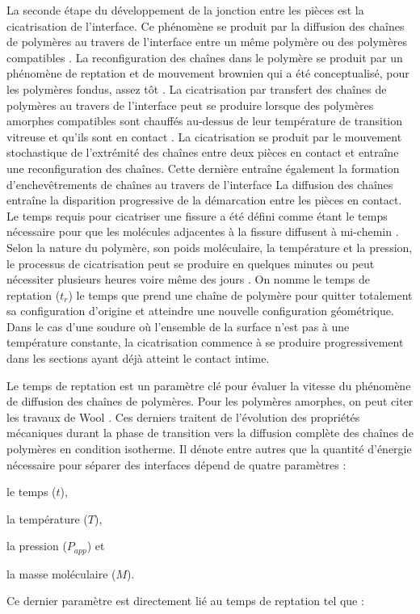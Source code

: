 La seconde étape du développement de la jonction entre les pièces est la cicatrisation de l'interface. 
Ce phénomène se produit par la diffusion des chaînes de polymères au travers de l'interface entre un même polymère ou des polymères compatibles \cite{Jud1981b}. 
La reconfiguration des chaînes dans le polymère se produit par un phénomène de reptation et de mouvement brownien qui a été conceptualisé, pour les polymères fondus, assez tôt \cite{DeGennes1971,Edwards1978b,Klein1978,Daoud1979}. 
La cicatrisation par transfert des chaînes de polymères au travers de l'interface peut se produire lorsque des polymères amorphes compatibles sont chauffés au-dessus de leur température de transition vitreuse et qu'ils sont en contact \cite{Jud1981a,Prager1981a}. 
La cicatrisation se produit par le mouvement stochastique de l'extrémité des chaînes entre deux pièces en contact et entraîne une reconfiguration des chaînes. 
Cette dernière entraîne également la formation d'enchevêtrements de chaînes au travers de l'interface \cite{Wool1983}
La diffusion des chaînes entraîne la disparition progressive de la démarcation entre les pièces en contact. 
Le temps requis pour cicatriser une fissure a été défini comme étant le temps nécessaire pour que les molécules adjacentes à la fissure diffusent à mi-chemin \cite{Prager1981a}.
Selon la nature du polymère, son poids moléculaire, la température et la pression, le processus de cicatrisation peut se produire en quelques minutes ou peut nécessiter plusieurs heures voire même des jours \cite{Prager1981a}. 
On nomme le temps de reptation ($t_r$) le temps que prend une chaîne de polymère pour quitter totalement sa configuration d'origine et atteindre une nouvelle configuration géométrique. 
Dans le cas d'une soudure où l'ensemble de la surface n'est pas à une température constante, la cicatrisation commence à se produire progressivement dans les sections ayant déjà atteint le contact intime. 

Le temps de reptation est un paramètre clé pour évaluer la vitesse du phénomène de diffusion des chaînes de polymères. 
Pour les polymères amorphes, on peut citer les travaux de Wool \cite{Wool1983,Wool1989}. 
Ces derniers traitent de l'évolution des propriétés mécaniques durant la phase de transition vers la diffusion complète des chaînes de polymères en condition isotherme. 
Il dénote entre autres que la quantité d'énergie nécessaire pour séparer des interfaces dépend de quatre paramètres : \begin{inparaenum}[(1)]
	\item le temps ($t$), 
	\item la température ($T$), 
	\item la pression ($P_{app}$) et
	\item la masse moléculaire ($M$). 
\end{inparaenum}
Ce dernier paramètre est directement lié au temps de reptation tel que \cite{DeGennes1971}: 

